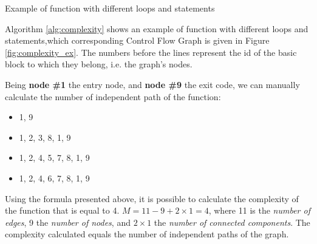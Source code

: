\begin{algorithm}
	\caption{Example of function with different loops and statements}\label{alg:complexity}
	\begin{algorithmic}[1]
		
		\setcounter{ALG@line}{0}
		\setcounter{ALG@line}{1}
		\setcounter{ALG@line}{2}
		\Else{ }
		\setcounter{ALG@line}{3}
		\setcounter{ALG@line}{4}
		\Else{}
		\setcounter{ALG@line}{5}
		
		\EndIf
		
		\EndIf
		\setcounter{ALG@line}{7}
		
		
		
		\EndWhile
		
		
		
		\setcounter{ALG@line}{0}
		
		
	\end{algorithmic}
\end{algorithm}

Algorithm \ref{alg:complexity} shows an example of function with different loops and statements,which corresponding Control Flow Graph is given in Figure \ref{fig:complexity_ex}. The numbers before the lines represent the id of the basic block to which they belong, i.e. the graph's nodes.

Being \textbf{node \#1} the entry node, and \textbf{node \#9} the exit code, we can manually calculate the number of independent path of the function:
\begin{itemize}
	\item 1, 9
	\item 1, 2, 3, 8, 1, 9
	\item 1, 2, 4, 5, 7, 8, 1, 9
	\item 1, 2, 4, 6, 7, 8, 1, 9
\end{itemize}

	Using the formula presented above, it is possible to calculate the complexity of the function that is equal to 4. $M = 11 - 9 + 2 \times 1 = 4$, where 11 is the \textit{number of edges}, 9 the \textit{number of nodes}, and $2 \times 1$ the \textit{number of connected components}. The complexity calculated equals the number of independent paths of the graph.

